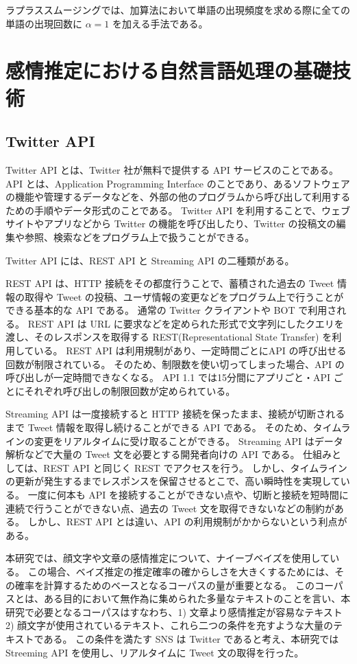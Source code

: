 \documentclass[11pt,a4j]{jsarticle}
\begin{document}
ラプラススムージングでは、加算法において単語の出現頻度を求める際に全ての単語の出現回数に $\alpha=1$ を加える手法である。
 
\section{感情推定における自然言語処理の基礎技術}
\subsection{Twitter API}
 Twitter API とは、Twitter 社が無料で提供する API サービスのことである。
API とは、Application Programming Interface のことであり、あるソフトウェアの機能や管理するデータなどを、外部の他のプログラムから呼び出して利用するための手順やデータ形式のことである。
Twitter API を利用することで、ウェブサイトやアプリなどから Twitter の機能を呼び出したり、Twitter の投稿文の編集や参照、検索などをプログラム上で扱うことができる。

Twitter API には、REST API と Streaming API の二種類がある。

REST API は、HTTP 接続をその都度行うことで、蓄積された過去の Tweet 情報の取得や Tweet の投稿、ユーザ情報の変更などをプログラム上で行うことができる基本的な API である。
通常の Twitter クライアントや BOT で利用される。
REST API は URL に要求などを定められた形式で文字列にしたクエリを渡し、そのレスポンスを取得する REST(Representational State Transfer) を利用している。
REST API は利用規制があり、一定時間ごとにAPI の呼び出せる回数が制限されている。
そのため、制限数を使い切ってしまった場合、API の呼び出しが一定時間できなくなる。
API 1.1 では15分間にアプリごと・API ごとにそれぞれ呼び出しの制限回数が定められている。

Streaming API は一度接続すると HTTP 接続を保ったまま、接続が切断されるまで Tweet 情報を取得し続けることができる API である。
そのため、タイムラインの変更をリアルタイムに受け取ることができる。
Streaming API はデータ解析などで大量の Tweet 文を必要とする開発者向けの API である。
仕組みとしては、REST API と同じく REST でアクセスを行う。
しかし、タイムラインの更新が発生するまでレスポンスを保留させるとこで、高い瞬時性を実現している。
一度に何本も API を接続することができない点や、切断と接続を短時間に連続で行うことができない点、過去の Tweet 文を取得できないなどの制約がある。
しかし、REST API とは違い、API の利用規制がかからないという利点がある。

本研究では、顔文字や文章の感情推定について、ナイーブベイズを使用している。
この場合、ベイズ推定の推定確率の確からしさを大きくするためには、その確率を計算するためのベースとなるコーパスの量が重要となる。
このコーパスとは、ある目的において無作為に集められた多量なテキストのことを言い、本研究で必要となるコーパスはすなわち、1) 文章より感情推定が容易なテキスト 2) 顔文字が使用されているテキスト、これら二つの条件を充すような大量のテキストである。
この条件を満たす SNS は Twitter であると考え、本研究では Streeming API を使用し、リアルタイムに Tweet 文の取得を行った。
\end{document}
